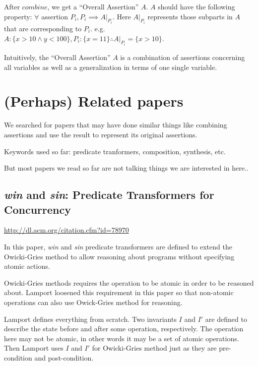 \documentclass[12pt, fleqn]{article}
\begin{document}
\bigskip

After $combine$, we get a ``Overall Assertion'' $A$. $A$ should have
the following property: $\forall$ assertion $P_i, P_i \implies
A|_{P_i}$.  Here $A|_{P_i}$ represents those subparts in $A$ that are
corresponding to $P_i$. e.g. $A: \{x > 10 \land y < 100\}, P_i: \{x =
11\} \therefore A|_{P_i} = \{x > 10\}$.

Intuitively, the ``Overall Assertion'' $A$ is a combination of
assertions concerning all variables as well as a generalization in
terms of one single variable.


\section{(Perhaps) Related papers}

We searched for papers that may have done similar things like
combining assertions and use the result to represent its original
assertions.

Keywords used so far: predicate tranformers, composition, synthesis,
etc.

But most papers we read so far are not talking things we are
interested in here..

\subsection{\textsl{win} and \textsl{sin}: Predicate Transformers for Concurrency}

\url{http://dl.acm.org/citation.cfm?id=78970}

\bigskip

In this paper, \textsl{win} and \textsl{sin} predicate transformers
are defined to extend the Owicki-Gries method to allow reasoning about
programs without specifying atomic actions.

Owicki-Gries methods requires the operation to be atomic in order to
be reasoned about. Lamport loosened this requirement in this paper so
that non-atomic operations can also use Owick-Gries method for
reasoning.

Lamport defines everything from scratch. Two invariants $I$ and $I'$
are defined to describe the state before and after some operation,
respectively. The operation here may not be atomic, in other words it
may be a set of atomic operations. Then Lamport uses $I$ and $I'$ for
Owicki-Gries method just as they are pre-condition and post-condition.
\end{document}
